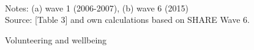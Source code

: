 \documentclass[10pt, letterpaper]{article}
\begin{document}
\begin{spacing}{1.4}
\begin{figure}[H]
\centering
\caption{Volunteering and wellbeing} 
\label{fig:taub}
\begin{minipage}{1\linewidth}
\quad
{}~\\
{\footnotesize Notes: (a) wave 1 (2006-2007), (b) wave 6 (2015) }~\\
{\footnotesize Source: \citet{haski09} [Table 3] and own calculations based on SHARE Wave 6.}
\end{minipage}
\end{figure} 

%



\end{spacing}
\end{document}
